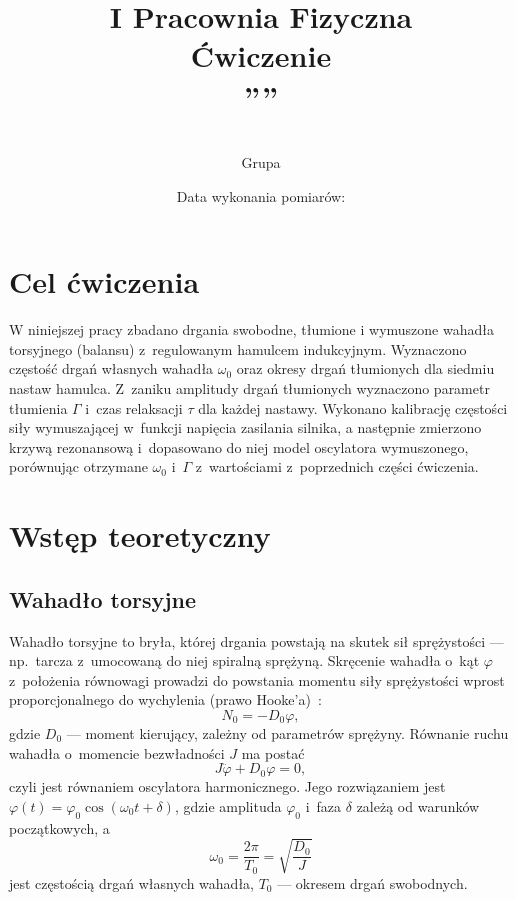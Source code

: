 \documentclass[12pt, a4paper]{article}
\title{
    \large I Pracownia Fizyczna \\[0.5em]
    \textbf{Ćwiczenie \nrCwiczenia} \\[0.3em]
    \LARGE \tytul\space''\codeword''
}
\author{
    \autor\\
     Grupa \nrGrupy}
\date{
    Data wykonania pomiarów: \dataWykonania\\
}
\begin{document}

\maketitle
\thispagestyle{empty}
\newpage

\section{Cel ćwiczenia}

W niniejszej pracy zbadano drgania swobodne, tłumione i wymuszone wahadła torsyjnego
(balansu) z~regulowanym hamulcem indukcyjnym. Wyznaczono częstość drgań własnych
wahadła $\omega_0$ oraz okresy drgań tłumionych dla siedmiu nastaw hamulca.
Z~zaniku amplitudy drgań tłumionych wyznaczono parametr tłumienia $\Gamma$ i~czas
relaksacji $\tau$ dla każdej nastawy. Wykonano kalibrację częstości siły wymuszającej
w~funkcji napięcia zasilania silnika, a następnie zmierzono krzywą rezonansową
i~dopasowano do niej model oscylatora wymuszonego, porównując otrzymane $\omega_0$
i~$\Gamma$ z~wartościami z~poprzednich części ćwiczenia.

\section{Wstęp teoretyczny}

\subsection{Wahadło torsyjne}

Wahadło torsyjne to bryła, której drgania powstają na skutek sił sprężystości ---
np.\ tarcza z~umocowaną do niej spiralną sprężyną. Skręcenie wahadła o~kąt $\varphi$
z~położenia równowagi prowadzi do powstania momentu siły sprężystości wprost
proporcjonalnego do wychylenia (prawo Hooke'a)~\cite{skrypt}:
\begin{equation}
    N_0 = -D_0\varphi,
    \label{eq:hooke}
\end{equation}
gdzie $D_0$ --- moment kierujący, zależny od parametrów sprężyny.
Równanie ruchu wahadła o~momencie bezwładności $J$ ma postać
\begin{equation}
    J\ddot{\varphi} + D_0\varphi = 0,
    \label{eq:harmonic}
\end{equation}
czyli jest równaniem oscylatora harmonicznego. Jego rozwiązaniem jest
$\varphi(t) = \varphi_0\cos(\omega_0 t + \delta)$, gdzie amplituda $\varphi_0$ i~faza
$\delta$ zależą od warunków początkowych, a
\begin{equation}
    \omega_0 = \frac{2\pi}{T_0} = \sqrt{\frac{D_0}{J}}
    \label{eq:omega0}
\end{equation}
jest częstością drgań własnych wahadła, $T_0$ --- okresem drgań swobodnych.
\end{document}
